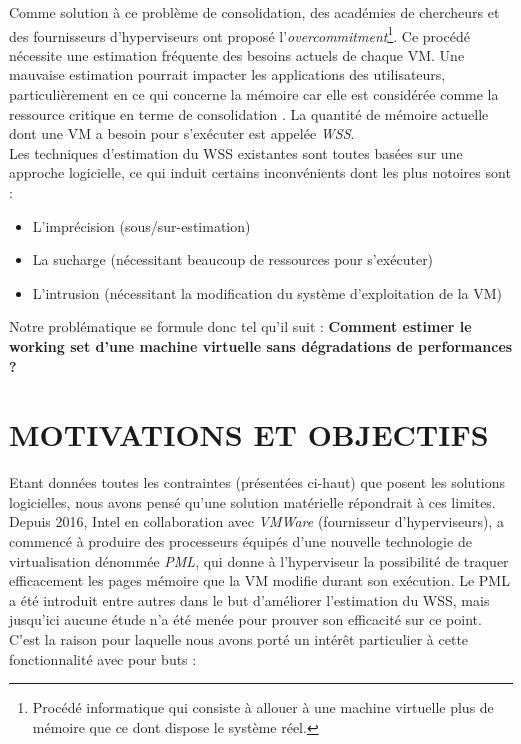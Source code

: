 \noindent Comme solution à ce problème de consolidation, des académies de chercheurs et des fournisseurs d'hyperviseurs ont proposé l'\emph{overcommitment}\footnote{Procédé informatique qui consiste à allouer à une machine virtuelle plus de mémoire que ce dont dispose le système réel.}. Ce procédé nécessite une estimation fréquente des besoins actuels de chaque VM. Une mauvaise estimation pourrait impacter les applications des utilisateurs, particulièrement en ce qui concerne la mémoire car elle est considérée comme la ressource critique en terme de consolidation \cite{datacenter}. La quantité de mémoire actuelle dont une VM a besoin pour s'exécuter est appelée \textit{\ac{WSS}}.\\
Les techniques d'estimation du WSS existantes sont toutes basées sur une approche logicielle, ce qui induit certains inconvénients dont les plus notoires sont : 

\begin{itemize}[label=, font=\large \color{darkorange}]
    \item L'imprécision (sous/sur-estimation)
    \item La sucharge (nécessitant beaucoup de ressources pour s'exécuter)
    \item L'intrusion (nécessitant la modification du système d'exploitation de la VM)
\end{itemize}

\noindent Notre problématique se formule donc tel qu'il suit : \textbf{Comment estimer le working set d'une machine virtuelle sans dégradations de performances ?}

\section*{MOTIVATIONS ET OBJECTIFS}

Etant données toutes les contraintes (présentées ci-haut) que posent les solutions logicielles, nous avons pensé qu'une solution matérielle répondrait à ces limites.\\
Depuis 2016, Intel en collaboration avec \emph{VMWare} (fournisseur d'hyperviseurs), a commencé à produire des processeurs équipés d'une nouvelle technologie de virtualisation dénommée \textit{\ac{PML}}, qui donne à l'hyperviseur la possibilité de traquer efficacement les pages mémoire que la VM modifie durant son exécution. Le PML a été introduit entre autres dans le but d'améliorer l'estimation du WSS, mais jusqu'ici aucune étude n'a été menée pour prouver son efficacité sur ce point. C'est la raison pour laquelle nous avons porté un intérêt particulier à cette fonctionnalité avec pour buts :


